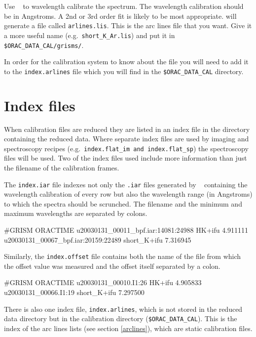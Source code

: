 \documentclass[twoside,11pt,nolof]{starlink}
\providecommand{\FIGARO}{\xref{{\sc{Figaro}}}{sun86}{}}
\begin{document}
Use \FIGARO\  to wavelength calibrate the
spectrum. The wavelength calibration should be in Angstroms. A 2nd or
3rd order fit is likely to be most appropriate.  will generate a file called \texttt{arlines.lis}.
This is the arc lines file that you want. Give it a more useful name
(e.g.\ \texttt{short\_K\_Ar.lis}) and put it in \texttt{\$ORAC\_DATA\_CAL/grisms/}.

In order for the calibration system to know about the file you will
need to add it to the \texttt{index.arlines} file which you will find in
the \texttt{\$ORAC\_DATA\_CAL} directory.

\section{Index files}

When calibration files are reduced they are listed in an index file in
the directory containing the reduced data. Where separate index files
are used by imaging and spectroscopy recipes (e.g.\ \texttt{index.flat\_im and index.flat\_sp}) the spectroscopy files will be
used. Two of the index files used include more information than just
the filename of the calibration frames.

The \texttt{index.iar} file indexes not only the \texttt{.iar} files
generated by \FIGARO\  containing the
wavelength calibration of every row but also the wavelength range (in
Angstroms) to which the spectra should be scrunched. The filename and
the minimum and maximum wavelengths are separated by colons.

\begin{terminalv}
      #GRISM ORACTIME
      u20030131_00011_bpf.iar:14081:24988 HK+ifu 4.911111
      u20030131_00067_bpf.iar:20159:22489 short_K+ifu 7.316945
\end{terminalv}

Similarly, the \texttt{index.offset} file contains both the name of the
file from which the offset value was measured and the offset itself
separated by a colon.

\begin{terminalv}
      #GRISM ORACTIME
      u20030131_00010.I1:26 HK+ifu 4.905833
      u20030131_00066.I1:19 short_K+ifu 7.297500
\end{terminalv}

There is also one index file, \texttt{index.arlines}, which is not stored
in the reduced data directory but in the calibration directory (\texttt{\$ORAC\_DATA\_CAL}). This is the index of the arc lines lists (see
section \ref{arclines}), which are static calibration files.
\end{document}
